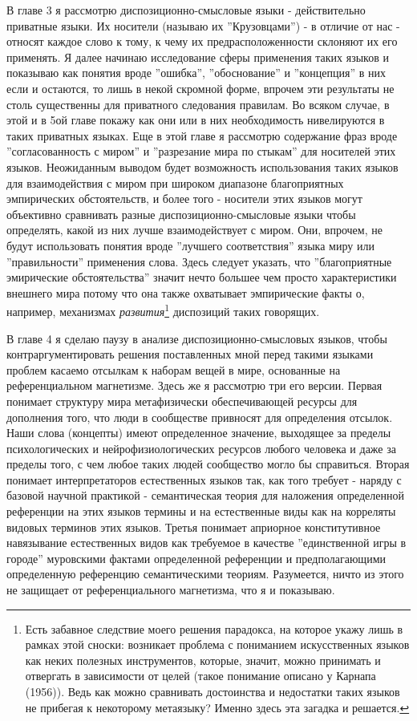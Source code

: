 \documentclass{book}
\begin{document}
В главе 3 я рассмотрю диспозиционно-смысловые языки - действительно приватные языки. Их носители (называю их ''Крузовцами'') - в отличие от нас - относят каждое слово к тому, к чему их предрасположенности склоняют их его применять. Я далее начинаю исследование сферы применения таких языков и показываю как понятия вроде ''ошибка'', ''обоснование'' и ''концепция'' в них если и остаются, то лишь в некой скромной форме, впрочем эти результаты не столь существенны для приватного следования правилам. Во всяком случае, в этой и в 5ой главе покажу как они или в них необходимость нивелируются в таких приватных языках. Еще в этой главе я рассмотрю содержание фраз вроде ''согласованность с миром'' и ''разрезание мира по стыкам'' для носителей этих языков. Неожиданным выводом будет возможность использования таких языков для взаимодействия с миром при широком диапазоне благоприятных эмпирических обстоятельств, и более того - носители этих языков могут объективно сравнивать разные диспозиционно-смысловые языки чтобы определять, какой из них лучше взаимодействует с миром. Они, впрочем, не будут использовать понятия вроде ''лучшего соответствия'' языка миру или ''правильности'' применения слова. Здесь следует указать, что ''благоприятные эмирические обстоятельства'' значит нечто большее чем просто характеристики внешнего мира потому что она также охватывает эмпирические факты о, например, механизмах \textit{развития}\footnote{Есть забавное следствие моего решения парадокса, на которое укажу лишь в рамках этой сноски: возникает проблема с пониманием искусственных языков как неких полезных инструментов, которые, значит, можно принимать и отвергать в зависимости от целей (такое понимание описано у Карнапа (1956)). Ведь как можно сравнивать достоинства и недостатки таких языков не прибегая к некоторому метаязыку? Именно здесь эта загадка и решается.} диспозиций таких говорящих.

В главе 4 я сделаю паузу в анализе диспозиционно-смысловых языков, чтобы контраргументировать решения поставленных мной перед такими языками проблем касаемо отсылкам к наборам вещей в мире, основанные на референциальном магнетизме. Здесь же я рассмотрю три его версии. Первая понимает структуру мира метафизически обеспечивающей ресурсы для дополнения того, что люди в сообществе привносят для определения отсылок. Наши слова (концепты) имеют определенное значение, выходящее за пределы психологических и нейрофизиологических ресурсов любого человека и даже за пределы того, с чем любое таких людей сообщество могло бы справиться. Вторая понимает интерпретаторов естественных языков так, как того требует - наряду с базовой научной практикой - семантическая теория для наложения определенной референции на этих языков термины и на естественные виды как на корреляты видовых терминов этих языков. Третья понимает априорное конститутивное навязывание естественных видов как требуемое в качестве ''единственной игры в городе'' муровскими фактами определенной референции и предполагающими определенную референцию семантическими теориям. Разумеется, ничто из этого не защищает от референциального магнетизма, что я и показываю.
\end{document}
